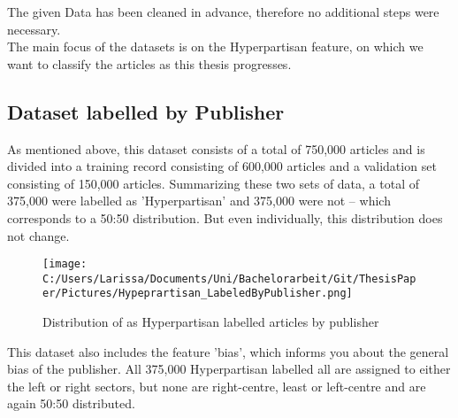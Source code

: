 \documentclass[a4paper, 11pt,titlepage,oneside,openany]{book}
\begin{document}
 \noindent The given Data has been cleaned in advance, therefore no additional steps were necessary.\\ 
 The main focus of the datasets is on the Hyperpartisan feature, on which we want to classify the articles as this thesis progresses.
 

\subsection{Dataset labelled by Publisher}
As mentioned above, this dataset consists of a total of 750,000 articles and is divided into a training record consisting of 600,000 articles and a validation set consisting of 150,000 articles. Summarizing these two sets of data, a total of 375,000 were labelled as 'Hyperpartisan' and 375,000 were not – which corresponds to a 50:50 distribution. But even individually, this distribution does not change. 
\begin{figure}[h]
	\centering
	\texttt{[image: C:/Users/Larissa/Documents/Uni/Bachelorarbeit/Git/ThesisPaper/Pictures/Hypeprartisan\_LabeledByPublisher.png]}
	\caption{Distribution of as Hyperpartisan labelled articles by publisher}
	\label{fig:example}
\end{figure}

\noindent This dataset also includes the feature 'bias', which informs you about the general bias of the publisher. All 375,000 Hyperpartisan labelled all are assigned to either the left or right sectors, but none are right-centre, least or left-centre and are again 50:50 distributed.
\end{document}
